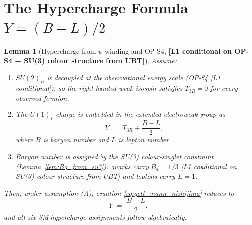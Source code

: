 \documentclass[12pt,a4paper]{article}
\newtheorem{lemma}[theorem]{Lemma}
\theoremstyle{definition}
\theoremstyle{remark}
\begin{document}
\section{The Hypercharge Formula $Y = (B-L)/2$}
\label{sec:hypercharge_formula}

\begin{lemma}[Hypercharge from $\psi$-winding and OP-S4,
              \textbf{[L1 conditional on OP-S4 + SU(3) colour structure from UBT]}]
\label{lem:hypercharge_formula}
Assume:
\begin{enumerate}
  \item[(A)] $SU(2)_R$ is decoupled at the observational energy scale
             (OP-S4 [L1 conditional]), so the right-handed weak isospin
             satisfies $T_{3R}=0$ for every observed fermion.
  \item[(B)] The $U(1)_Y$ charge is embedded in the extended electroweak
             group as
             \begin{equation}
               Y \;=\; T_{3R} + \frac{B{-}L}{2},
               \label{eq:gell_mann_nishijima}
             \end{equation}
             where $B$ is baryon number and $L$ is lepton number.
  \item[(C)] Baryon number is assigned by the SU(3) colour-singlet constraint
             (Lemma~\ref{lem:Bq_from_su3}): quarks carry $B_q=1/3$
             [L1 conditional on SU(3) colour structure from UBT] and
             leptons carry $L=1$.
\end{enumerate}
Then, under assumption (A), equation \eqref{eq:gell_mann_nishijima} reduces to
\begin{equation}
  \boxed{Y \;=\; \frac{B{-}L}{2},}
  \label{eq:Y_BL}
\end{equation}
and all six SM hypercharge assignments follow algebraically.
\end{lemma}
\end{document}
